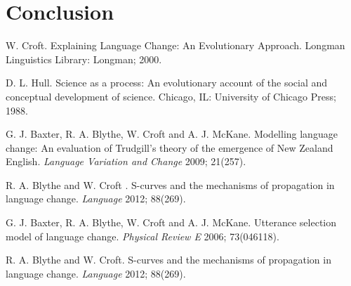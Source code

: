 \documentclass[12pt]{article}
\begin{document}
\newpage
\section{Conclusion}


\newpage
\begin{thebibliography}{99}
 W. Croft. Explaining Language Change: An Evolutionary Approach. Longman Linguistics Library: Longman; 2000. 

 D. L. Hull. Science as a process: An evolutionary account of the social and conceptual development of science. Chicago, IL: University of Chicago Press; 1988. 

 G. J. Baxter, R. A. Blythe, W. Croft and A. J. McKane. Modelling language change: An evaluation of Trudgill’s theory of the emergence of New Zealand English. \emph{Language Variation and Change} 2009; 21(257).

 R. A. Blythe and W. Croft . S-curves and the mechanisms of propagation in language change. \emph{Language} 2012; 88(269).





	G. J. Baxter, R. A. Blythe, W. Croft and A. J. McKane. Utterance selection model of language change. \emph{Physical Review E} 2006; 73(046118). 

	R. A. Blythe and W. Croft. S-curves and the mechanisms of propagation in language change. \emph{Language} 2012; 88(269). 

\end{thebibliography}
\end{document}
